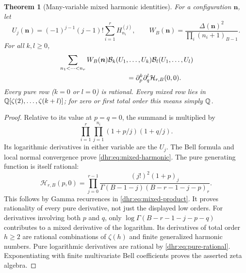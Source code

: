 \documentclass[11pt,letterpaper]{article}
\numberwithin{equation}{section}
\newtheorem{theorem}{Theorem}[section]
\theoremstyle{definition}\newtheorem{definition}[theorem]{Definition}
\theoremstyle{remark}\newtheorem{remark}[theorem]{Remark}
\newcommand{\Bell}{\mathcal B}
\begin{document}
\begin{theorem}[Many-variable mixed harmonic identities]
\label{dhr:thm:mixed}
For a configuration $\bm n$, let
\[
 U_j(\bm n)=(-1)^{j-1}(j-1)!\sum_{i=1}^rH_{n_i}^{(j)},\qquad
 W_B(\bm n)=\frac{\Delta(\bm n)^2}{\prod_i(n_i+1)_{B-1}}.
\]
For all $k,l\geq0$,
\begin{align}
 &\sum_{n_1<\cdots<n_r}W_B(\bm n)
 \Bell_k(U_1,\ldots,U_k)\Bell_l(U_1,\ldots,U_l)\notag\\
 &\hspace{35mm}=\partial_p^k\partial_q^l
               \mathcal H_{r,B}(0,0).
 \label{dhr:eq:mixed-harmonic}
\end{align}
Every pure row ($k=0$ or $l=0$) is rational. Every mixed row lies
in $\mathbb Q[\zeta(2),\ldots,\zeta(k+l)]$; for zero or first total order
this means simply $\mathbb Q$.
\end{theorem}
\begin{proof}
Relative to its value at $p=q=0$, the summand is multiplied by
\[
 \prod_{i=1}^r\prod_{j=1}^{n_i}(1+p/j)(1+q/j).
\]
Its logarithmic derivatives in either variable are the $U_j$.
The Bell formula and local normal convergence prove
\eqref{dhr:eq:mixed-harmonic}. The pure generating function is
itself rational:
\begin{equation}\label{dhr:eq:pure-rational}
 \mathcal H_{r,B}(p,0)=
 \prod_{j=0}^{r-1}
 \frac{(j!)^2(1+p)_j}
 {\Gamma(B-1-j)(B-r-1-j-p)_r}.
\end{equation}
This follows by Gamma recurrences in \eqref{dhr:eq:mixed-product}.
It proves rationality of every pure derivative, not just the displayed
low orders. For derivatives involving both $p$ and $q$, only
$\log\Gamma(B-r-1-j-p-q)$ contributes to a mixed derivative
of the logarithm. Its derivatives of total order $h\geq2$ are
rational combinations of $\zeta(h)$ and finite generalized harmonic
numbers. Pure logarithmic derivatives are rational by
\eqref{dhr:eq:pure-rational}. Exponentiating with finite multivariate
Bell coefficients proves the asserted zeta algebra.
\end{proof}
\end{document}
